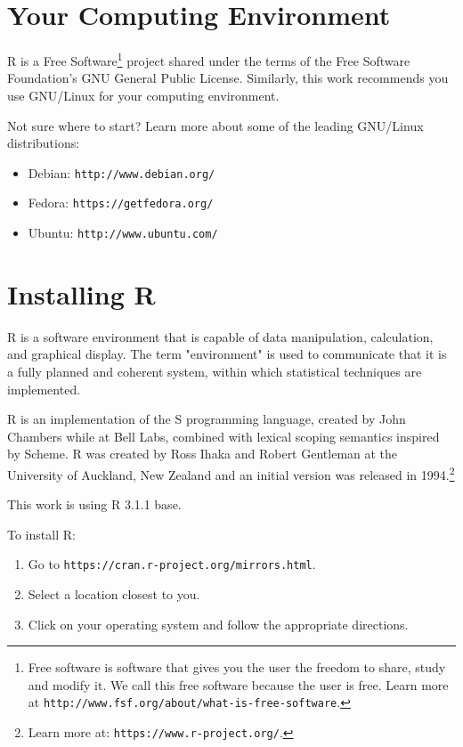 %
%
%
%
%

\section{Your Computing Environment}
R is a Free Software\footnote{Free software is software that gives you the user the freedom to share, study and modify it. We call this free software because the user is free. Learn more at \texttt{http://www.fsf.org/about/what-is-free-software}.} project shared under the terms of the Free Software Foundation's GNU General Public License. Similarly, this work recommends you use GNU/Linux for your computing environment. 

Not sure where to start? Learn more about some of the leading GNU/Linux distributions:

\begin{itemize}
 \item Debian: \texttt{http://www.debian.org/}
 \item Fedora: \texttt{https://getfedora.org/}
 \item Ubuntu: \texttt{http://www.ubuntu.com/}
\end{itemize}

\section{Installing R}
R is a software environment that is capable of data manipulation, calculation, and graphical display. The term "environment" is used to communicate that it is a fully planned and coherent system, within which statistical techniques are implemented.

R is an implementation of the S programming language, created by John Chambers while at Bell Labs, combined with lexical scoping semantics inspired by Scheme. R was created by Ross Ihaka and Robert Gentleman at the University of Auckland, New Zealand and an initial version was released in 1994.\footnote{Learn more at: \texttt{https://www.r-project.org/}.}

This work is using R 3.1.1 base.

To install R:

\begin{enumerate}
 \item Go to \texttt{https://cran.r-project.org/mirrors.html}.
 \item Select a location closest to you.
 \item Click on your operating system and follow the appropriate directions.
\end{enumerate}

